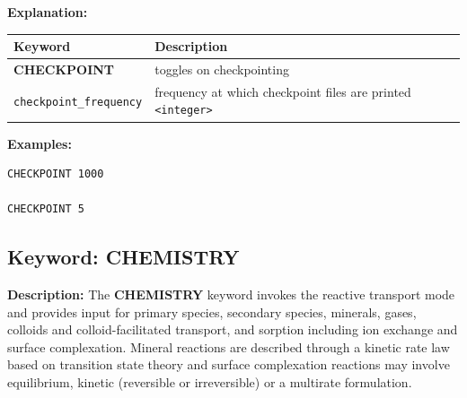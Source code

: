 \documentclass[12pt]{article}
\begin{document}
{\noindent\bf Explanation:}

\begin{center}
\begin{tabularx}{\linewidth}{lX}
\toprule[1.5pt]
\bf Keyword & \bf Description\\
\midrule
\bf CHECKPOINT & toggles on checkpointing \\
{\tt checkpoint\_frequency} & frequency at which checkpoint files are printed {\tt<integer>} \\
\bottomrule
\end{tabularx}
\end{center}

\bigskip

{\noindent\bf Examples:}
\begin{verbatim}
CHECKPOINT 1000

CHECKPOINT 5
\end{verbatim}

\newpage
\protect\hypertarget{target_chem}{}

\subsection{Keyword: CHEMISTRY}

\noindent
{\bf Description:}
The {\bf CHEMISTRY} keyword invokes the reactive transport mode and provides input for primary species, secondary species, minerals, gases, colloids and colloid-facilitated transport, and sorption including ion exchange and surface complexation. Mineral reactions are described through a kinetic rate law based on transition state theory and surface complexation reactions may involve equilibrium, kinetic (reversible or irreversible) or a multirate formulation.


\end{document}
